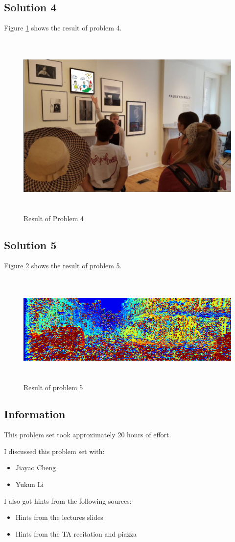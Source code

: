 \documentclass{article}
\newcommand{\info}{\clearpage \subsection*{Information}}
\newcommand{\solution}[1]{\clearpage \subsection*{Solution #1}}
\begin{document}
\solution{4} 
Figure \ref{fig:prob4} shows the result of problem 4.
\begin{figure}[!h]
  \centering
  \includegraphics[height=25em]{code/outputs/prob4.png}
  \caption{Result of Problem 4}
  \label{fig:prob4}
\end{figure}

\solution{5}
Figure \ref{fig:prob5} shows the result of problem 5.
\begin{figure}[!h]
  \centering
  \includegraphics[height=15em]{code/outputs/prob5.png}
  \caption{Result of problem 5}
  \label{fig:prob5}
\end{figure}


\info

This problem set took approximately 20 hours of effort.

I discussed this problem set with:
\begin{itemize}
\item Jiayao Cheng
\item Yukun Li
\end{itemize}

I also got hints from the following sources:
\begin{itemize}
\item Hints from the lectures slides
\item Hints from the TA recitation and piazza
\end{itemize}
\end{document}
